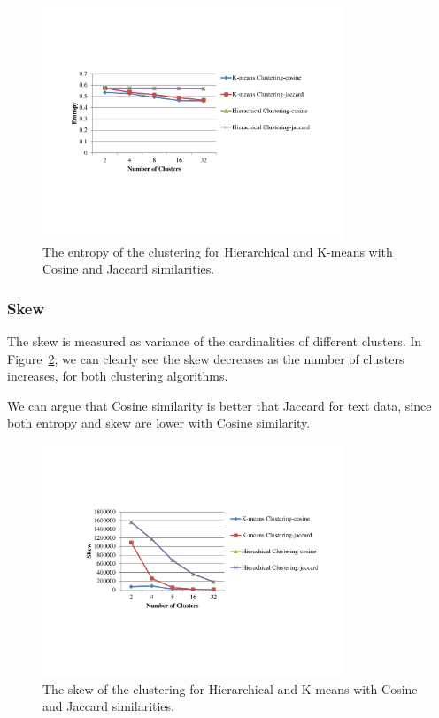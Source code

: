 \documentclass{article}
\begin{document}
\begin{figure}
\centering
\includegraphics[width=0.8\textwidth]{Entropy}
\caption{\footnotesize The entropy of the clustering for Hierarchical and K-means
with Cosine and Jaccard similarities.}
\label{Fig:entropy}
\end{figure}

\subsubsection{Skew}
The skew is measured as variance of the cardinalities of different clusters.
In Figure~\ref{Fig:skew}, we can clearly see the skew decreases as the number of
clusters increases, for both clustering algorithms.

We can argue that Cosine similarity is better that Jaccard for text data, since
both entropy and skew are lower with Cosine similarity.
\begin{figure}[b!]
\centering
\includegraphics[width=0.8\textwidth]{Skew}
\caption{\footnotesize The skew of the clustering for Hierarchical and K-means
with Cosine and Jaccard similarities.}
\label{Fig:skew}
\end{figure}
\end{document}
